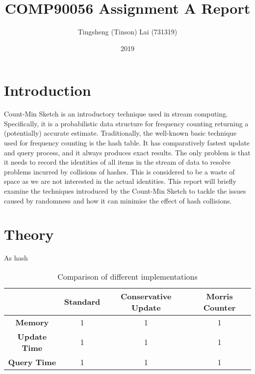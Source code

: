 \documentclass[a4paper, 11pt]{article}
\title{\textbf{COMP90056 Assignment A Report}}
\author{Tingsheng (Tinson) Lai (731319)}
\date{2019}
\begin{document}
    \maketitle
    \section{Introduction}
    Count-Min Sketch is an introductory technique used in stream computing. Specifically, it is a probabilistic data structure for frequency counting returning a (potentially) accurate estimate. Traditionally, the well-known basic technique used for frequency counting is the hash table. It has comparatively fastest update and query process, and it always produces exact results. The only problem is that it needs to record the identities of all items in the stream of data to resolve problems incurred by collisions of hashes. This is considered to be a waste of space as we are not interested in the actual identities. This report will briefly examine the techniques introduced by the Count-Min Sketch to tackle the issues caused by randomness and how it can minimise the effect of hash collisions.
    \section{Theory}
        As hash
        \begin{table}[!h]
            \centering
            \begin{tabular}{|c|c|c|c|}
                \hline
                                     & \textbf{Standard} & \textbf{Conservative Update} & \textbf{Morris Counter} \\
                \hline
                \textbf{Memory}      & 1                 & 1                            & 1                       \\
                \hline
                \textbf{Update Time} & 1                 & 1                            & 1                       \\
                \hline
                \textbf{Query Time}  & 1                 & 1                            & 1                       \\
                \hline
            \end{tabular}
            \caption{Comparison of different implementations}
            \label{table:comparison}
        \end{table}
\end{document}

